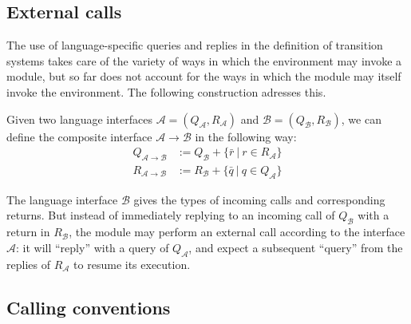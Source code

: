 
\subsection{External calls} %

The use of language-specific queries and replies
in the definition of transition systems
takes care of the variety of ways
in which the environment may invoke a module,
but so far does not account for the ways in which
the module may itself invoke the environment.
The following construction adresses this.

\begin{definition}
Given two language interfaces
$\mathcal{A} = (Q_\mathcal{A}, R_\mathcal{A})$ and
$\mathcal{B} = (Q_\mathcal{B}, R_\mathcal{B})$,
we can define the composite interface
$\mathcal{A} \rightarrow \mathcal{B}$
in the following way:
\begin{align*}
  Q_{\mathcal{A} \rightarrow \mathcal{B}} &:=
    Q_\mathcal{B} + \{ \bar{r} \:|\: r \in R_\mathcal{A} \} \\
  R_{\mathcal{A} \rightarrow \mathcal{B}} &:=
    R_\mathcal{B} + \{ \bar{q} \:|\: q \in Q_\mathcal{A} \}
\end{align*}
\end{definition}

The language interface $\mathcal{B}$
gives the types of incoming calls and corresponding returns.
But instead of immediately replying to an incoming call of $Q_\mathcal{B}$
with a return in $R_\mathcal{B}$,
the module may perform an external call
according to the interface $\mathcal{A}$:
it will ``reply'' with a query of $Q_\mathcal{A}$,
and expect a subsequent ``query'' from the replies of $R_\mathcal{A}$
to resume its execution.


\subsection{Calling conventions} \label{sec:callconv} %

